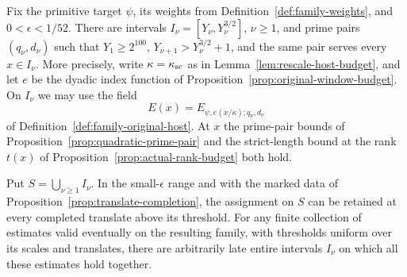 \begin{auxlemma}
\label{lem:disjoint-common-pair-windows}
Fix the primitive target \(\psi\), its weights from
Definition~\ref{def:family-weights}, and \(0<\epsilon<1/52\).
There are intervals \(I_\nu=[Y_\nu,Y_\nu^{3/2}]\), \(\nu\ge1\), and
prime pairs \((q_\nu,d_\nu)\) such that \(Y_1\ge 2^{100}\),
\(Y_{\nu+1}>Y_\nu^{3/2}+1\), and the same pair serves every
\(x\in I_\nu\). More precisely, write \(\kappa=\kappa_{\rm sc}\)
as in Lemma~\ref{lem:rescale-host-budget}, and let \(e\) be the
dyadic index function of Proposition~\ref{prop:original-window-budget}.
On \(I_\nu\) we may use the field
\[
 E(x)=E_{\psi,e(x/\kappa);q_\nu,d_\nu}
\]
of Definition~\ref{def:family-original-host}. At \(x\) the prime-pair
bounds of Proposition~\ref{prop:quadratic-prime-pair} and the
strict-length bound at the rank \(t(x)\) of
Proposition~\ref{prop:actual-rank-budget} both hold.

Put \(S=\bigcup_{\nu\ge1} I_\nu\). In the small-\(\epsilon\) range and with the marked data of
Proposition~\ref{prop:translate-completion}, the assignment on \(S\)
can be retained at every completed translate above its threshold.
For any finite collection of estimates valid eventually on the resulting
family, with thresholds uniform over its scales and translates, there
are arbitrarily late entire intervals \(I_\nu\) on which all these
estimates hold together.
\end{auxlemma}

